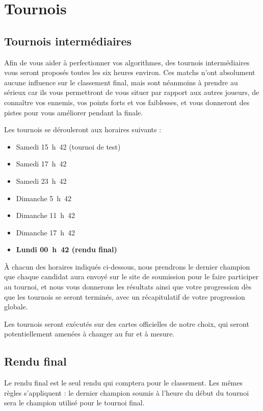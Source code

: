 \section{Tournois}

\subsection{Tournois intermédiaires}

Afin de vous aider à perfectionner vos algorithmes, des tournois intermédiaires
vous seront proposés toutes les six heures environ. Ces matchs n'ont absolument
aucune influence sur le classement final, mais sont néanmoins à prendre au
sérieux car ils vous permettront de vous situer par rapport aux autres
joueurs, de connaître vos ennemis, vos points forts et vos faiblesses, et vous
donneront des pistes pour vous améliorer pendant la finale.

Les tournois se dérouleront aux horaires suivants :

\begin{itemize}
    \item Samedi 15~h~42 (tournoi de test)
    \item Samedi 17~h~42
    \item Samedi 23~h~42
    \item Dimanche 5~h~42
    \item Dimanche 11~h~42
    \item Dimanche 17~h~42
    \item \textbf{Lundi 00~h~42 (rendu final)}
\end{itemize}

À chacun des horaires indiqués ci-dessous, nous prendrons le dernier champion
que chaque candidat aura envoyé sur le site de soumission pour le faire
participer au tournoi, et nous vous donnerons les résultats ainsi que votre
progression dès que les tournois se seront terminés, avec un récapitulatif
de votre progression globale.

Les tournois seront exécutés sur des cartes officielles de notre choix, qui
seront potentiellement amenées à changer au fur et à mesure.

\subsection{Rendu final}

Le rendu final est le seul rendu qui comptera pour le classement. Les mêmes
règles s'appliquent : le dernier champion soumis à l'heure du début du tournoi
sera le champion utilisé pour le tournoi final.

